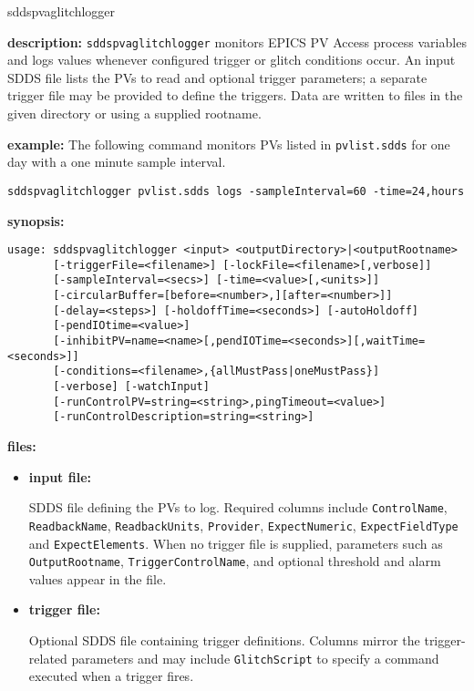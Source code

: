\begin{sddsprog}{sddspvaglitchlogger}
\item {\bf description:}
\verb+sddspvaglitchlogger+ monitors EPICS PV Access process variables and
logs values whenever configured trigger or glitch conditions occur.  An input
SDDS file lists the PVs to read and optional trigger parameters; a separate
trigger file may be provided to define the triggers.  Data are written to
files in the given directory or using a supplied rootname.

\item {\bf example:}
The following command monitors PVs listed in \verb+pvlist.sdds+ for one day
with a one minute sample interval.
\begin{verbatim}
sddspvaglitchlogger pvlist.sdds logs -sampleInterval=60 -time=24,hours
\end{verbatim}

\item {\bf synopsis:}
\begin{verbatim}
usage: sddspvaglitchlogger <input> <outputDirectory>|<outputRootname>
       [-triggerFile=<filename>] [-lockFile=<filename>[,verbose]]
       [-sampleInterval=<secs>] [-time=<value>[,<units>]]
       [-circularBuffer=[before=<number>,][after=<number>]]
       [-delay=<steps>] [-holdoffTime=<seconds>] [-autoHoldoff]
       [-pendIOtime=<value>]
       [-inhibitPV=name=<name>[,pendIOTime=<seconds>][,waitTime=<seconds>]]
       [-conditions=<filename>,{allMustPass|oneMustPass}]
       [-verbose] [-watchInput]
       [-runControlPV=string=<string>,pingTimeout=<value>]
       [-runControlDescription=string=<string>]
\end{verbatim}

\item {\bf files:}
  \begin{itemize}
  \item {\bf input file:}\par
    SDDS file defining the PVs to log. Required columns include
    {\tt ControlName}, {\tt ReadbackName}, {\tt ReadbackUnits},
    {\tt Provider}, {\tt ExpectNumeric}, {\tt ExpectFieldType} and
    {\tt ExpectElements}. When no trigger file is supplied, parameters such as
    {\tt OutputRootname}, {\tt TriggerControlName}, and optional threshold and
    alarm values appear in the file.
  \item {\bf trigger file:}\par
    Optional SDDS file containing trigger definitions. Columns mirror the
    trigger-related parameters and may include {\tt GlitchScript} to specify a
    command executed when a trigger fires.
  \end{itemize}


\end{sddsprog}
